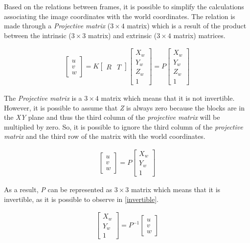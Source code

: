 Based on the relations between frames, it is possible to simplify the calculations associating the image coordinates with the world coordinates. The relation is made through a \textit{Projective matrix} ($3\times 4$ matrix) which is a result of the product between the intrinsic ($3\times 3$ matrix) and extrinsic ($3\times 4$ matrix) matrices.

\begin{align} 
\begin{bmatrix}
    \textit{u} \\ 
    \textit{v} \\
    \textit{w} 
\end{bmatrix}
=
\textit{K}
\begin{bmatrix}
    \textit{R}  & \textit{T}
\end{bmatrix}
\begin{bmatrix}
   X_{w}\\
   Y_{w}\\
   Z_{w}\\
	1
\end{bmatrix}
=
\textit{P}
\begin{bmatrix}
   X_{w}\\
   Y_{w}\\
   Z_{w}\\
	1
\end{bmatrix}
\end{align}

The \textit{Projective matrix} is a $3\times 4$ matrix which means that it is not invertible. However, it is possible to assume that \textit{Z} is always zero because the blocks are in the \textit{XY} plane and thus the third column of the \textit{projective matrix} will be multiplied by zero. So, it is possible to ignore the third column of the \textit{projective matrix} and the third row of the matrix with the world coordinates.

\begin{align} 
\begin{bmatrix}
    \textit{u} \\ 
    \textit{v} \\
    \textit{w} 
\end{bmatrix}
=
\textit{P}
\begin{bmatrix}
   X_{w}\\
   Y_{w}\\
	1
\end{bmatrix}
\end{align}

As a result, \textit{P} can be represented as $3\times 3$ matrix which means that it is invertible, as it is possible to observe in \ref{invertible}. 

\begin{align}
\begin{bmatrix}
   X_{w}\\
   Y_{w}\\
	1
\end{bmatrix} 
=
\textit{P}^{-1}
\begin{bmatrix}
    \textit{u} \\ 
    \textit{v} \\
    \textit{w} 
\end{bmatrix}
\label{invertible}
\end{align}

